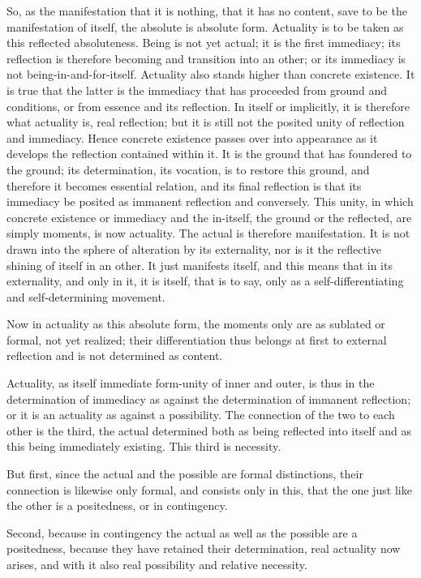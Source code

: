 So, as the manifestation that it is nothing,
that it has no content, save to be the manifestation of itself,
the absolute is absolute form.
Actuality is to be taken as this reflected absoluteness.
Being is not yet actual;
it is the first immediacy;
its reflection is therefore becoming
and transition into an other;
or its immediacy is not being-in-and-for-itself.
Actuality also stands higher than concrete existence.
It is true that the latter is the immediacy
that has proceeded from ground and conditions,
or from essence and its reflection.
In itself or implicitly, it is therefore
what actuality is, real reflection;
but it is still not the posited unity of reflection and immediacy.
Hence concrete existence passes over into appearance
as it develops the reflection contained within it.
It is the ground that has foundered to the ground;
its determination, its vocation, is to restore this ground,
and therefore it becomes essential relation,
and its final reflection is that its
immediacy be posited as immanent reflection and conversely.
This unity, in which concrete existence
or immediacy and the in-itself,
the ground or the reflected, are simply moments,
is now actuality.
The actual is therefore manifestation.
It is not drawn into the sphere of alteration by its externality,
nor is it the reflective shining of itself in an other.
It just manifests itself, and this means that in its externality,
and only in it, it is itself, that is to say,
only as a self-differentiating and self-determining movement.

Now in actuality as this absolute form,
the moments only are as sublated or formal, not yet realized;
their differentiation thus belongs at first to external reflection
and is not determined as content.

Actuality, as itself immediate form-unity of inner and outer,
is thus in the determination of immediacy
as against the determination of immanent reflection;
or it is an actuality as against a possibility.
The connection of the two to each other is the third,
the actual determined both as being reflected into itself
and as this being immediately existing.
This third is necessity.

But first, since the actual and the possible are formal distinctions,
their connection is likewise only formal, and consists only in this,
that the one just like the other is a positedness, or in contingency.

Second, because in contingency the actual
as well as the possible are a positedness,
because they have retained their determination,
real actuality now arises,
and with it also real possibility
and relative necessity.

